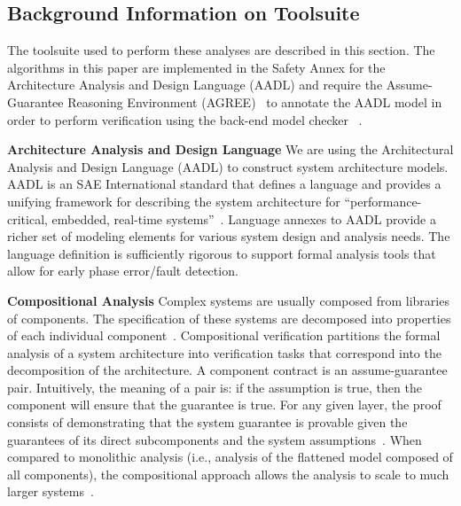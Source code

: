 \subsection{Background Information on Toolsuite}
The toolsuite used to perform these analyses are described in this section. The algorithms in this paper are implemented in the Safety Annex for the Architecture Analysis and Design Language (AADL) and require the Assume-Guarantee Reasoning Environment (AGREE)~\cite{NFM2012:CoGaMiWhLaLu} to annotate the AADL model in order to perform verification using the back-end model checker \jkind~\cite{2017arXiv171201222G}. 

\textbf{Architecture Analysis and Design Language}
We are using the Architectural Analysis and Design Language (AADL) to construct system architecture models. AADL is an SAE International standard that defines a language and provides a unifying framework for describing the system architecture for ``performance-critical, embedded, real-time systems''~\cite{AADL_Standard,FeilerModelBasedEngineering2012}. %
Language annexes to AADL provide a richer set of modeling elements for various system design and analysis needs.%
The language definition is sufficiently rigorous to support formal analysis tools that allow for early phase error/fault detection. 

\textbf{Compositional Analysis} 
Complex systems are usually composed from libraries of components. The specification of these systems are decomposed into properties of each individual component~\cite{clarke1989compositional}. %
Compositional verification partitions the formal analysis of a system architecture into verification tasks that correspond into the decomposition of the architecture. A component contract is an assume-guarantee pair. Intuitively, the meaning of a pair is: if the assumption is true, then the component will ensure that the guarantee is true. %
For any given layer, the proof consists of demonstrating that the system guarantee is provable given the guarantees of its direct subcomponents and the system assumptions~\cite{cofer2012compositional}. %
When compared to monolithic analysis (i.e., analysis of the flattened model composed of all components), the compositional approach allows the analysis to scale to much larger systems~\cite{NFM2012:CoGaMiWhLaLu,heckel1998compositional,cofer2012compositional}.

